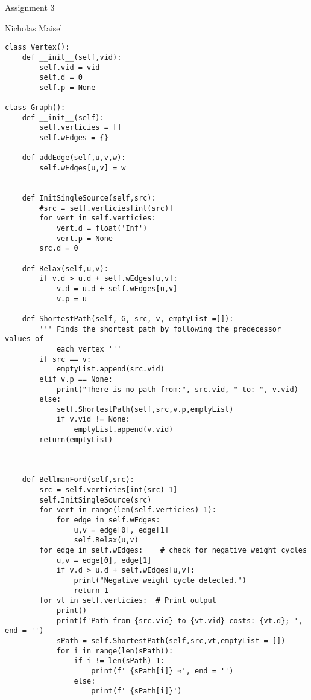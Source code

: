 \documentclass{article}
\begin{document}
\lstset{language=Python}
\lstset{frame=lines}
\lstset{basicstyle=\footnotesize\ttfamily}
\lstset{numbers = left}
\begin{center}
\large{Assignment 3}
\vspace{2mm}

Nicholas Maisel
\end{center}

\vspace{8mm}

\begin{lstlisting}
class Vertex():
    def __init__(self,vid):
        self.vid = vid
        self.d = 0
        self.p = None

class Graph():
    def __init__(self):
        self.verticies = []
        self.wEdges = {}

    def addEdge(self,u,v,w):
        self.wEdges[u,v] = w


    def InitSingleSource(self,src):
        #src = self.verticies[int(src)]
        for vert in self.verticies:
            vert.d = float('Inf')
            vert.p = None
        src.d = 0

    def Relax(self,u,v):
        if v.d > u.d + self.wEdges[u,v]:
            v.d = u.d + self.wEdges[u,v]
            v.p = u

    def ShortestPath(self, G, src, v, emptyList =[]):
        ''' Finds the shortest path by following the predecessor values of
            each vertex '''
        if src == v:
            emptyList.append(src.vid)
        elif v.p == None:
            print("There is no path from:", src.vid, " to: ", v.vid)
        else:
            self.ShortestPath(self,src,v.p,emptyList)
            if v.vid != None:
                emptyList.append(v.vid)
        return(emptyList)



    def BellmanFord(self,src):
        src = self.verticies[int(src)-1]
        self.InitSingleSource(src)
        for vert in range(len(self.verticies)-1):
            for edge in self.wEdges:
                u,v = edge[0], edge[1]
                self.Relax(u,v)
        for edge in self.wEdges:    # check for negative weight cycles
            u,v = edge[0], edge[1]
            if v.d > u.d + self.wEdges[u,v]:
                print("Negative weight cycle detected.")
                return 1
        for vt in self.verticies:  # Print output
            print()
            print(f'Path from {src.vid} to {vt.vid} costs: {vt.d}; ', end = '')
            sPath = self.ShortestPath(self,src,vt,emptyList = [])
            for i in range(len(sPath)):
                if i != len(sPath)-1:
                    print(f' {sPath[i]} ⇒', end = '')
                else:
                    print(f' {sPath[i]}')

\end{lstlisting}
\end{document}
